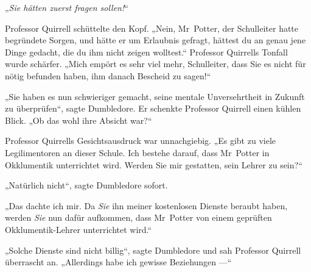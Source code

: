 „\emph{Sie hätten zuerst fragen sollen!}“

Professor Quirrell schüttelte den Kopf.
„Nein, Mr~Potter, der Schulleiter hatte begründete Sorgen, und hätte er um Erlaubnis gefragt, hättest du an genau jene Dinge gedacht, die du ihm nicht zeigen wolltest.“ Professor Quirrells Tonfall wurde schärfer.
„Mich empört es sehr viel mehr, Schulleiter, dass Sie es nicht für nötig befunden haben, ihm danach Bescheid zu sagen!“

„Sie haben es nun schwieriger gemacht, seine mentale Unversehrtheit in Zukunft zu überprüfen“, sagte Dumbledore. Er schenkte Professor Quirrell einen kühlen Blick.
„Ob das wohl ihre Absicht war?“

Professor Quirrells Gesichtsausdruck war unnachgiebig.
„Es gibt zu viele Legilimentoren an dieser Schule. Ich bestehe darauf, dass Mr~Potter in Okklumentik unterrichtet wird. Werden Sie mir gestatten, sein Lehrer zu sein?“

„Natürlich nicht“, sagte Dumbledore sofort.

„Das dachte ich mir. Da \emph{Sie} ihn meiner kostenlosen Dienste beraubt haben, werden \emph{Sie} nun dafür aufkommen, dass Mr~Potter von einem geprüften Okklumentik-Lehrer unterrichtet wird.“

„Solche Dienste sind nicht billig“, sagte Dumbledore und sah Professor Quirrell überrascht an.
„Allerdings habe ich gewisse Beziehungen —“

